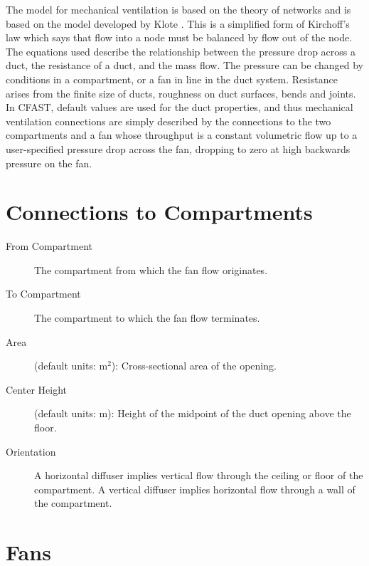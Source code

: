 The model for mechanical ventilation is based on the theory of networks and is based on the model developed by Klote \cite{Klote:1988a}.  This is a simplified form of Kirchoff's law which says that flow into a node must be balanced by flow out of the node. The equations used describe the relationship between the pressure drop across a duct, the resistance of a duct, and the mass flow.  The pressure can be changed by conditions in a compartment, or a fan in line in the duct system.  Resistance arises from the finite size of ducts, roughness on duct surfaces, bends and joints. In CFAST, default values are used for the duct properties, and thus mechanical ventilation connections are simply described by the connections to the two compartments and a fan whose throughput is a constant volumetric flow up to a user-specified pressure drop across the fan, dropping to zero at high backwards pressure on the fan.

\section{Connections to Compartments}

\begin{description}
\item[From Compartment] The compartment from which the fan flow originates.
\item[To Compartment] The compartment to which the fan flow terminates.
\item[Area] (default units: m$^2$): Cross-sectional area of the opening.
\item[Center Height] (default units: m): Height of the midpoint of the duct opening above the floor.
\item[Orientation] A horizontal diffuser implies vertical flow through the ceiling or floor of the compartment.  A vertical diffuser implies horizontal flow through a wall of the compartment.
\end{description}

\section{Fans}


